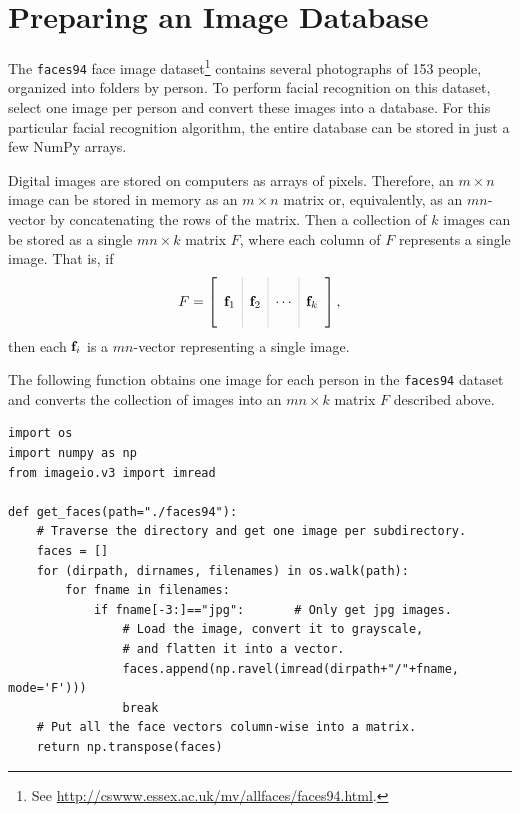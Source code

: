 \label{lab:FacialRecognition}


\section*{Preparing an Image Database} %

The \texttt{faces94} face image dataset\footnote{See \url{http://cswww.essex.ac.uk/mv/allfaces/faces94.html}.} contains several photographs of 153 people, organized into folders by person.
To perform facial recognition on this dataset, select one image per person and convert these images into a database.
For this particular facial recognition algorithm, the entire database can be stored in just a few NumPy arrays.

Digital images are stored on computers as arrays of pixels.
Therefore, an $m \times n$ image can be stored in memory as an $m\times n$ matrix or, equivalently, as an $mn$-vector by concatenating the rows of the matrix.
Then a collection of $k$ images can be stored as a single $mn\times k$ matrix $F$, where each column of $F$ represents a single image.
That is, if
\[
F = \left[\begin{array}{c|c|c|c}
\arrayrulecolor{lightgray}
& & & \\
\f_1 & \f_2 & \cdots & \f_k
\\
& & &
\end{array}\right],
\]
then each $\mathbf{f}_i$ is a $mn$-vector representing a single image.

The following function obtains one image for each person in the \texttt{faces94} dataset and converts the collection of images into an $mn \times k$ matrix $F$ described above.

\begin{lstlisting}
import os
import numpy as np
from imageio.v3 import imread

def get_faces(path="./faces94"):
    # Traverse the directory and get one image per subdirectory.
    faces = []
    for (dirpath, dirnames, filenames) in os.walk(path):
        for fname in filenames:
            if fname[-3:]=="jpg":       # Only get jpg images.
                # Load the image, convert it to grayscale,
                # and flatten it into a vector.
                faces.append(np.ravel(imread(dirpath+"/"+fname, mode='F')))
                break
    # Put all the face vectors column-wise into a matrix.
    return np.transpose(faces)
\end{lstlisting}

